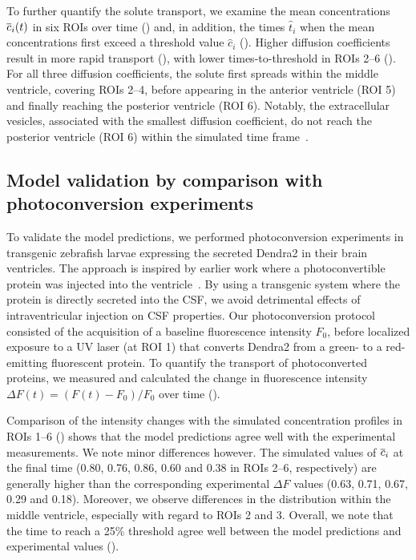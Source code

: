 \documentclass{WileyMSP-template}
\begin{document}
To further quantify the solute transport, we examine the mean
concentrations $\overline{c}_i(t)$ in six ROIs over time
() and, in addition, the times $\hat{t}_i$
when the mean concentrations first exceed a threshold value
$\hat{c}_i$ ().  Higher diffusion coefficients
result in more rapid transport (), with
lower times-to-threshold in ROIs 2--6 (). For
all three diffusion coefficients, the solute first spreads within the
middle ventricle, covering ROIs 2--4, before appearing in the anterior
ventricle (ROI 5) and finally reaching the posterior ventricle
(ROI 6). Notably, the extracellular vesicles, associated with the smallest diffusion
coefficient, do not reach the posterior ventricle (ROI 6) within the
simulated time frame~.

\subsection{Model validation by comparison with photoconversion experiments}

To validate the model predictions, we performed photoconversion
experiments in transgenic zebrafish larvae expressing the secreted
Dendra2 in their brain ventricles. The approach is inspired by earlier work
where a photoconvertible protein was injected into the ventricle~\cite{fame2016directional}.
By using a transgenic system where the protein is directly secreted into the CSF,
we avoid detrimental effects of intraventricular injection on CSF properties. 
Our photoconversion protocol
consisted of the acquisition of a baseline fluorescence intensity
$F_0$, before localized exposure to a UV laser (at ROI 1) that
converts Dendra2 from a green- to a red-emitting fluorescent
protein. To quantify the transport of photoconverted proteins, we
measured and calculated the change in fluorescence intensity $\Delta F(t)
= (F(t)-F_0)/F_0$ over time ().

Comparison of the intensity changes with the simulated concentration
profiles in ROIs 1--6 () shows that the
model predictions agree well with the experimental measurements. We
note minor differences however. The simulated values of $\overline{c}_i$ at
the final time (0.80, 0.76, 0.86, 0.60 and 0.38 in ROIs 2--6, respectively)
are generally higher than the corresponding experimental $\Delta F$
values (0.63, 0.71, 0.67, 0.29 and 0.18). Moreover, we observe
differences in the distribution within the middle ventricle,
especially with regard to ROIs 2 and 3. Overall, we note that the time
to reach a 25\% threshold agree well between the model predictions and
experimental values ().
\end{document}
